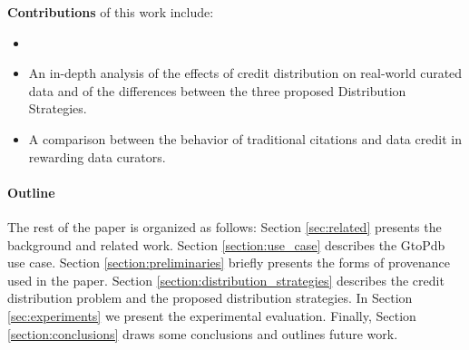 \textbf{Contributions}
 of this work include:
\begin{itemize}
    \item {}
    \item An in-depth analysis of the effects of credit distribution on real-world curated data and of the differences between the three proposed Distribution Strategies.
    \item A comparison between the behavior of traditional citations and data credit in rewarding data curators.
\end{itemize}

\paragraph{\textbf{Outline}} The rest of the paper is organized as follows:
Section \ref{sec:related} presents the background and related work. Section \ref{section:use_case} describes the GtoPdb use case. Section \ref{section:preliminaries} briefly presents the forms of provenance used in the paper.  Section \ref{section:distribution_strategies} describes the credit distribution problem and the proposed distribution strategies.  In Section \ref{sec:experiments} we present the experimental evaluation. Finally, Section \ref{section:conclusions} draws some conclusions and outlines future work.



 
